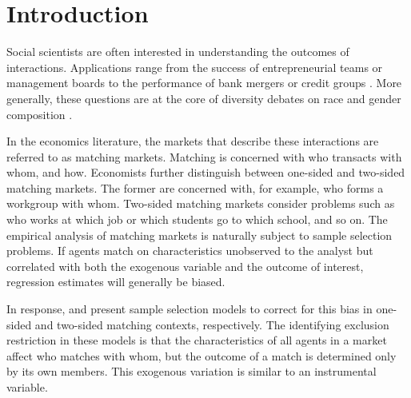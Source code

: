 \section{Introduction}

Social scientists are often interested in understanding the outcomes of interactions. Applications range from the success of entrepreneurial teams or management boards \citep{Hoogendoorn2013} to the performance of bank mergers or credit groups \citep{Klein2015a}. More generally, these questions are at the core of  diversity debates on race and gender composition \citep{Herring2009}. %

In the economics literature, the markets that describe these interactions are referred to as matching markets. Matching is concerned with who transacts with whom, and how. Economists further distinguish between one-sided and two-sided matching markets. The former are concerned with, for example, who forms a workgroup with whom. Two-sided matching markets consider problems such as who works at which job or which students go to which school, and so on. The empirical analysis of matching markets is naturally subject to sample selection problems. If agents match on characteristics unobserved to the analyst but correlated with both the exogenous variable and the outcome of interest, regression estimates will generally be biased.

In response, \citet{Klein2015a} and \citet{Sorensen2007} present sample selection models to correct for this bias in one-sided and two-sided matching contexts, respectively. The identifying exclusion restriction in these models is that the characteristics of all agents in a market affect who matches with whom, but the outcome of a match is determined only by its own members. This exogenous variation is similar to an instrumental variable.

